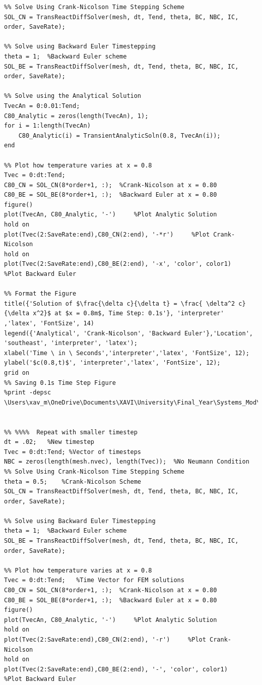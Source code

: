 \documentclass[11pt]{article}
\begin{document}
\begin{appendices}
\begin{lstlisting}
%% Solve Using Crank-Nicolson Time Stepping Scheme
SOL_CN = TransReactDiffSolver(mesh, dt, Tend, theta, BC, NBC, IC, order, SaveRate);

%% Solve using Backward Euler Timestepping
theta = 1;  %Backward Euler scheme
SOL_BE = TransReactDiffSolver(mesh, dt, Tend, theta, BC, NBC, IC, order, SaveRate);

%% Solve using the Analytical Solution
TvecAn = 0:0.01:Tend;
C80_Analytic = zeros(length(TvecAn), 1);
for i = 1:length(TvecAn)
    C80_Analytic(i) = TransientAnalyticSoln(0.8, TvecAn(i));
end
    
%% Plot how temperature varies at x = 0.8
Tvec = 0:dt:Tend;
C80_CN = SOL_CN(8*order+1, :);  %Crank-Nicolson at x = 0.80
C80_BE = SOL_BE(8*order+1, :);  %Backward Euler at x = 0.80
figure()
plot(TvecAn, C80_Analytic, '-')     %Plot Analytic Solution
hold on
plot(Tvec(2:SaveRate:end),C80_CN(2:end), '-*r')     %Plot Crank-Nicolson
hold on
plot(Tvec(2:SaveRate:end),C80_BE(2:end), '-x', 'color', color1)     %Plot Backward Euler

%% Format the Figure
title({'Solution of $\frac{\delta c}{\delta t} = \frac{ \delta^2 c}{\delta x^2}$ at $x = 0.8m$, Time Step: 0.1s'}, 'interpreter' ,'latex', 'FontSize', 14)
legend({'Analytical', 'Crank-Nicolson', 'Backward Euler'},'Location', 'southeast', 'interpreter', 'latex');
xlabel('Time \ in \ Seconds','interpreter','latex', 'FontSize', 12);
ylabel('$c(0.8,t)$', 'interpreter','latex', 'FontSize', 12);
grid on
%% Saving 0.1s Time Step Figure
%print -depsc \Users\xav_m\OneDrive\Documents\XAVI\University\Final_Year\Systems_Mod\Modeling_CW2\Report\Figures\epsQ1bdt05


%% %%%%  Repeat with smaller timestep 
dt = .02;   %New timestep
Tvec = 0:dt:Tend; %Vector of timesteps
NBC = zeros(length(mesh.nvec), length(Tvec));  %No Neumann Condition
%% Solve Using Crank-Nicolson Time Stepping Scheme
theta = 0.5;    %Crank-Nicolson Scheme
SOL_CN = TransReactDiffSolver(mesh, dt, Tend, theta, BC, NBC, IC, order, SaveRate);

%% Solve using Backward Euler Timestepping
theta = 1;  %Backward Euler scheme
SOL_BE = TransReactDiffSolver(mesh, dt, Tend, theta, BC, NBC, IC, order, SaveRate);

%% Plot how temperature varies at x = 0.8
Tvec = 0:dt:Tend;   %Time Vector for FEM solutions
C80_CN = SOL_CN(8*order+1, :);  %Crank-Nicolson at x = 0.80
C80_BE = SOL_BE(8*order+1, :);  %Backward Euler at x = 0.80
figure()
plot(TvecAn, C80_Analytic, '-')     %Plot Analytic Solution
hold on
plot(Tvec(2:SaveRate:end),C80_CN(2:end), '-r')     %Plot Crank-Nicolson
hold on
plot(Tvec(2:SaveRate:end),C80_BE(2:end), '-', 'color', color1)     %Plot Backward Euler


\end{lstlisting}
\end{appendices}
\end{document}
